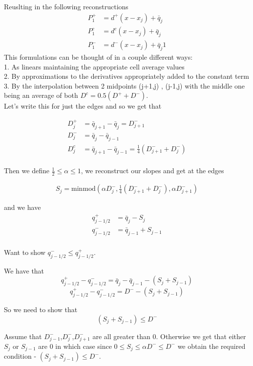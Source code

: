 \documentclass[10pt]{article}
\begin{document}
Reuslting in the following reconstructions
\begin{align}
P_1^+ &= d^+ \left(x - x_j\right) + \bar{q}_{j} \\
P_1^c &= d^c \left(x - x_j\right) + \bar{q}_{j} \\
P_1^- &=d^- \left(x - x_j\right) + \bar{q}_{j}1
\end{align}
This formulations can be thought of in a couple different ways: \\
1. As linears maintaining the appropriate cell average values \\ 
2. By approximations to the derivatives appropriately added to the constant term \\
3. By the interpolation between 2 midpoints (j+1,j) , (j-1,j) with the middle one being an average of both $D^c = 0.5\left(D^+ + D^-\right)$. \\

Let's write this for just the edges and so we get that

\begin{align}
D^+_j &= \bar{q}_{j+1} - \bar{q}_{j} = D^-_{j+1}  \\
D^-_j &= \bar{q}_{j} - \bar{q}_{j-1}\\
D^c_j &= \bar{q}_{j+1} - \bar{q}_{j-1} = \frac{1}{4}\left(D^-_{j+1} +D^-_{j}\right)  \\
\end{align}

Then we define $\frac{1}{2}\le \alpha \le 1$, we reconstruct our slopes and get at the edges

\begin{align}
S_j = \text{minmod}\left(\alpha D^-_j, \frac{1}{4}\left(D^-_{j+1} +D^-_{j}\right),\alpha D^-_{j+1}\right)
\end{align}

and we have
\begin{align}
q^+_{j-1/2} &= \bar{q}_{j} - S_j \\
q^-_{j-1/2} &= \bar{q}_{j-1} + S_{j-1} \\
\end{align}

Want to show $q^-_{j-1/2} \le q^+_{j-1/2}  $.

We have that
\[q^+_{j-1/2} - q^-_{j-1/2} = \bar{q}_{j} - \bar{q}_{j-1} - \left(S_j + S_{j-1}\right)  \]
\[q^+_{j-1/2} - q^-_{j-1/2} = D^- - \left(S_j + S_{j-1}\right)  \]

So we need to show that
\[\left(S_j + S_{j-1}\right) \le D^-\]

Assume that $D^-_{j-1}$,$D^-_{j}$,$D^-_{j+1}$ are all greater than $0$. Otherwise we get that either $S_j$ or $S_{j-1}$ are $0$ in which case since $0 \le S_j \le \alpha D^- \le D^-$ we obtain the required condition -  $\left(S_j + S_{j-1}\right) \le D^-$.
\end{document}
